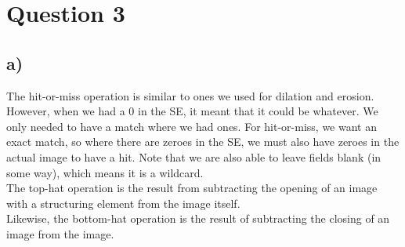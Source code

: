 \documentclass[a4paper]{article}
\begin{document}
\section*{Question 3}
\subsection*{a)}
The hit-or-miss operation is similar to ones we used for dilation and erosion. However, when we had a $0$ in the SE, it meant that it could be whatever. We only needed to have a match where we had ones. For hit-or-miss, we want an exact match, so where there are zeroes in the SE, we must also have zeroes in the actual image to have a hit. Note that we are also able to leave fields blank (in some way), which means it is a wildcard. \\
The top-hat operation is the result from subtracting the opening of an image with a structuring element from the image itself. \\
Likewise, the bottom-hat operation is the result of subtracting the closing of an image from the image.
\end{document}
